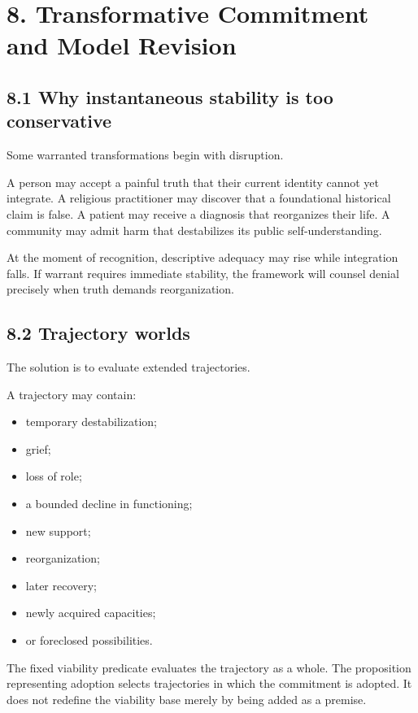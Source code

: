 \documentclass[
  11pt,
]{article}
\providecommand{\tightlist}{%
  \setlength{\itemsep}{0pt}\setlength{\parskip}{0pt}}
\begin{document}
\section{8. Transformative Commitment and Model
Revision}\label{transformative-commitment-and-model-revision}

\subsection{8.1 Why instantaneous stability is too
conservative}\label{why-instantaneous-stability-is-too-conservative}

Some warranted transformations begin with disruption.

A person may accept a painful truth that their current identity cannot
yet integrate. A religious practitioner may discover that a foundational
historical claim is false. A patient may receive a diagnosis that
reorganizes their life. A community may admit harm that destabilizes its
public self-understanding.

At the moment of recognition, descriptive adequacy may rise while
integration falls. If warrant requires immediate stability, the
framework will counsel denial precisely when truth demands
reorganization.

\subsection{8.2 Trajectory worlds}\label{trajectory-worlds}

The solution is to evaluate extended trajectories.

A trajectory may contain:

\begin{itemize}
\tightlist
\item
  temporary destabilization;
\item
  grief;
\item
  loss of role;
\item
  a bounded decline in functioning;
\item
  new support;
\item
  reorganization;
\item
  later recovery;
\item
  newly acquired capacities;
\item
  or foreclosed possibilities.
\end{itemize}

The fixed viability predicate evaluates the trajectory as a whole. The
proposition representing adoption selects trajectories in which the
commitment is adopted. It does not redefine the viability base merely by
being added as a premise.
\end{document}

